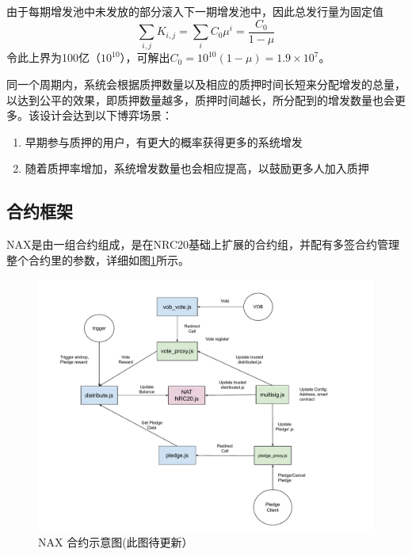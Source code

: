由于每期增发池中未发放的部分滚入下一期增发池中，因此总发行量为固定值
\begin{equation}
  \sum_{i,j} K_{i,j} = \sum_i C_0 \mu^i = \frac{C_0}{1-\mu}
\end{equation}
令此上界为100亿（\(10^{10}\)），可解出\(C_0 = 10^{10}(1-\mu) = 1.9\times10^7\)。


同一个周期内，系统会根据质押数量以及相应的质押时间长短来分配增发的总量，以达到公平的效果，即质押数量越多，质押时间越长，所分配到的增发数量也会更多。该设计会达到以下博弈场景：
\begin{enumerate}
  \item 早期参与质押的用户，有更大的概率获得更多的系统增发
  \item 随着质押率增加，系统增发数量也会相应提高，以鼓励更多人加入质押
\end{enumerate}

\subsection{合约框架}
NAX是由一组合约组成，是在NRC20基础上扩展的合约组，并配有多签合约管理整个合约里的参数，详细如图\ref{fig:nax_framework}所示。

\begin{figure}[htbp]
  \centering
    \includegraphics[width=1\textwidth]{../common/ch/nax.pdf}
    \caption{NAX 合约示意图(此图待更新） \label{fig:nax_framework}}
\end{figure}
